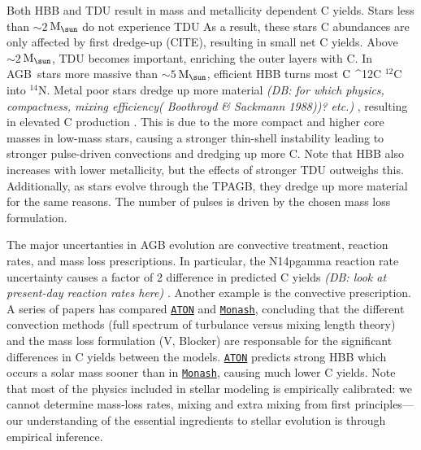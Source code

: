 \documentclass[fleqn,
usenatbib]{mnras}
\makeatletter
\newcommand{\monash}{\texttt{\hyperlink{monash}{Monash}}}
\newcommand{\aton}{\texttt{\hyperlink{aton}{ATON}}}
\newcommand{\agb}{AGB}
\newcommand{\C}[1][\@nil]{
    \def\tmp{#1}%
    \ifx\tmp\@nnil%
        \ensuremath{\rm C}%
    \else%
        \ifmmode ^{#1}{\rm C}%
        \else $^{#1}$C%
        \fi%
\fi }
\newcommand{\Mo}{ {\rm M}_{\sun}}
\newcommand{\about}[1]{${\sim} #1$}
\newcommand{\dbnote}[1]{ {\color{Thistle} \textit{\small (DB: #1)}} }
\makeatother
\begin{document}


Both HBB and TDU result in mass and metallicity dependent C yields. 
Stars less than \about{2}\,$\Mo$ do not experience TDU As a result, these stars C abundances are only affected by first dredge-up (CITE), resulting in small net C yields.
Above \about{2}\,$\Mo$, TDU becomes important, enriching the outer layers with C.
In \agb\ stars more massive than \about{5}\,$\Mo$, efficient HBB turns most \C[12] into $^{14}$N.
Metal poor stars dredge up more material \dbnote{for which physics, compactness, mixing efficiency( Boothroyd \& Sackmann 1988))? etc.}, resulting in elevated C production \citep[e.g.][]{ventura+13}.
This is due to  the more compact and higher core masses in low-mass stars, causing a stronger thin-shell instability leading to stronger pulse-driven convections and dredging up more C. Note that HBB also increases with lower metallicity, but the effects of stronger TDU outweighs this. Additionally, as stars evolve through the TPAGB, they dredge up more material for the same reasons. The number of pulses is driven by the chosen mass loss formulation.


The major uncertanties in AGB evolution are convective treatment, reaction rates, and mass loss prescriptions.
In particular, the N14pgamma reaction rate uncertainty causes a factor of 2 difference in predicted C yields \citep{herwig+austin2004, HAL2006} \dbnote{look at present-day reaction rates here}.
Another example is the convective prescription. A series of papers has compared \aton{} and \monash{}, concluding that the different convection methods (full spectrum of turbulance versus mixing length theory) and the mass loss formulation (V, Blocker) are responsable for the significant differences in C yields between the models. \aton{} predicts strong HBB which occurs a solar mass sooner than in \monash{}, causing much lower C yields.
Note that most of the physics included in stellar modeling is empirically calibrated: we cannot determine mass-loss rates, mixing and extra mixing from first principles---our understanding of the essential ingredients to stellar evolution is through empirical inference.
\end{document}
